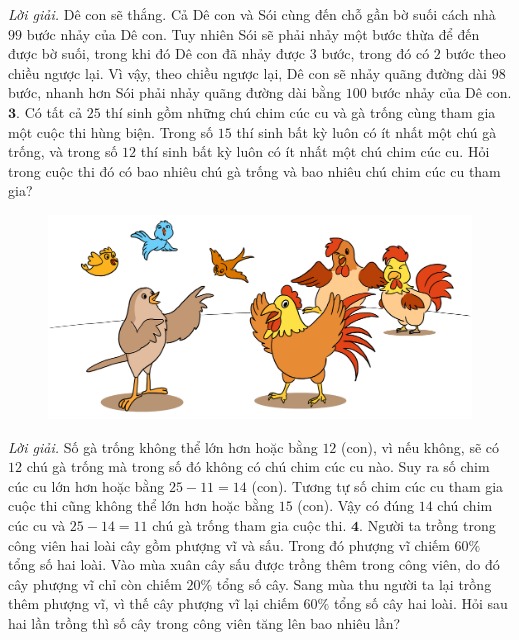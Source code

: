\begin{multicols}{2}
\begin{figure}[H]
		\vspace*{-5pt}
	\end{figure}
	\textit{Lời giải.} 	Dê con sẽ thắng. Cả Dê con và Sói cùng đến chỗ gần bờ suối cách nhà $99$ bước nhảy của Dê con. Tuy nhiên Sói sẽ phải nhảy một bước thừa để đến được bờ suối, trong khi đó Dê con đã nhảy được $3$ bước, trong đó có $2$ bước theo chiều ngược lại. Vì vậy, theo chiều ngược lại, Dê con sẽ nhảy quãng đường dài $98$ bước, nhanh hơn Sói phải nhảy quãng đường dài bằng $100$ bước nhảy của Dê con.
	\vskip 0.1cm
	$\pmb{3.}$ Có tất cả $25$ thí sinh gồm những chú chim cúc cu và gà trống cùng tham gia một cuộc thi hùng biện. Trong số $15$ thí sinh bất kỳ luôn có ít nhất một chú gà trống, và trong số $12$ thí sinh bất kỳ luôn có ít nhất một chú chim cúc cu. Hỏi trong cuộc thi đó có bao nhiêu chú gà trống và bao nhiêu chú chim cúc cu tham gia?
	\begin{figure}[H]
		\centering
		\vspace*{-5pt}
		\captionsetup{labelformat= empty, justification=centering}
		\includegraphics[width=1\linewidth]{Pi6_bai3}
		\vspace*{-15pt}
	\end{figure}
	\textit{Lời giải.} Số gà trống không thể lớn hơn hoặc bằng $12$ (con), vì nếu không, sẽ có $12$ chú gà trống mà trong số đó không có chú chim cúc cu nào. Suy ra số chim cúc cu lớn hơn hoặc bằng $25-11=14$ (con).
	\vskip 0.1cm
	Tương tự số chim cúc cu tham gia cuộc thi cũng không thể lớn hơn hoặc bằng $15$ (con).
	\vskip 0.1cm
	Vậy có đúng $14$ chú chim cúc cu và $25-14=11$ chú gà trống tham gia cuộc thi.
	\vskip 0.1cm
	$\pmb{4.}$ Người ta trồng trong công viên hai loài cây gồm phượng vĩ và sấu. Trong đó phượng vĩ chiếm $60\%$ tổng số hai loài. Vào mùa xuân cây sấu được trồng thêm trong công viên, do đó cây phượng vĩ chỉ còn chiếm $20\%$ tổng số cây. Sang mùa thu người ta lại trồng thêm  phượng vĩ, vì thế cây phượng vĩ lại chiếm $60\%$ tổng số cây hai loài. Hỏi sau hai lần trồng thì số cây trong công viên tăng lên bao nhiêu lần?

\end{multicols}
